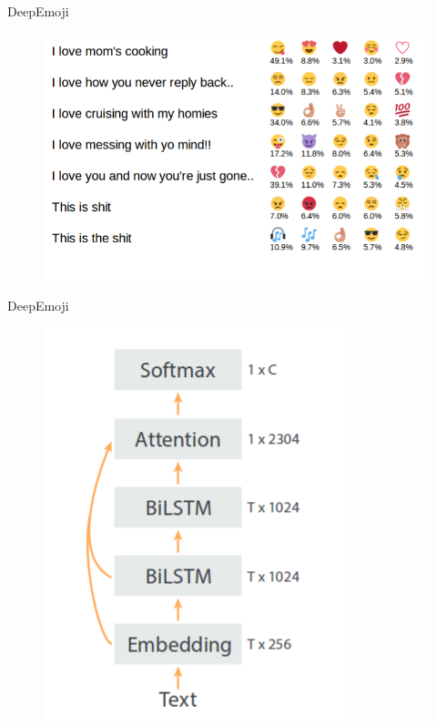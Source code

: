 \documentclass[handout]{beamer}
\begin{document}
\begin{frame}{DeepEmoji}
  \begin{figure}[h]
        	\includegraphics[scale = 0.45]{pics/deepEmoji1.png}
        \end{figure}    
        
\end{frame}




\begin{frame}{DeepEmoji}
   
    \begin{figure}[h]
        	\includegraphics[scale = 0.45]{pics/deepEmoji2.png}
        \end{figure}       
        
\end{frame}
\end{document}

